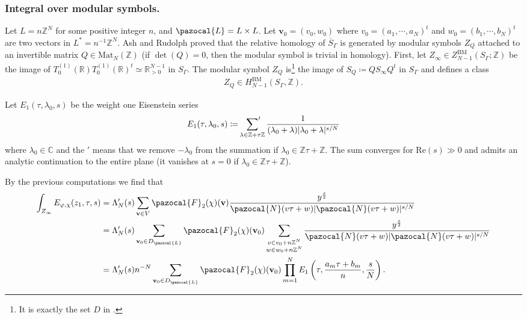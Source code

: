 \documentclass[a4paper,11pt]{amsart} %
\newcommand{\8}{\infty}
\newcommand{\Z}{\mathbb{Z}}
\newcommand{\vbf}{\mathbf{v}}
\newcommand{\four}{\pazocal{F}}
\newcommand{\BM}{\mathrm{BM}}
\newcommand{\R}{\mathbb{R}}
\newcommand{\C}{\mathbb{C}}
\newcommand{\N}{\pazocal{N}}
\newcommand{\Lcal}{\pazocal{L}}
\newcommand{\re}{\mathrm{Re}}
\newcommand{\Mat}{\mathrm{Mat}}
\theoremstyle{mytheoremstyle}
\theoremstyle{remark}
\numberwithin{equation}{section}
\begin{document}
\subsubsection{Integral over modular symbols.} Let $L=n\Z^{N}$ for some positive integer $n$, and $\Lcal=L \times L$. Let $\vbf_0=(v_0,w_0)$ where $v_0=(a_1, \cdots, a_N)^t$ and $w_0=(b_1, \cdots, b_N)^t$ are two vectors in $L^\ast = n^{-1}\Z^{N}$. Ash and Rudolph \cite{ashrud} proved that the relative homology of $\overline{S}_\Gamma$ is generated by modular symbols $Z_Q$ attached to an invertible matrix $Q \in \Mat_N(\Z)$ (if $\det(Q) =0$, then the modular symbol is trivial in homology). First, let $Z_\8 \in Z^{\BM}_{N-1}(S_\Gamma;\Z)$ be the image of $T_0^{(1)}(\R)T_0^{(1)}(\R)^t \simeq \R_{>0}^{N-1}$ in $S_\Gamma$. The modular symbol $Z_Q$ is\footnote{It is exactly the set $D$ in \cite[p.~245]{ashrud}.} the image of $S_Q \coloneqq QS_\8Q^t$ in $S_\Gamma$ and defines a class
\begin{align}
Z_Q \in H^{\BM}_{N-1}(S_\Gamma,\Z).
\end{align}

Let $E_1(\tau,\lambda_0,s)$ be the weight one Eisenstein series
\begin{align}
E_1(\tau,\lambda_0,s) \coloneqq \sideset{}{^{\prime}}\sum_{\lambda \in \Z+\tau\Z }\frac{1}{(\lambda_0+\lambda)\vert \lambda_0+\lambda\rvert^{s/N}}
\end{align}
where $\lambda_0 \in \C$ and the $'$ means that we remove $-\lambda_0$ from the summation if $\lambda_0 \in \Z \tau+\Z$. The sum converges for $\re(s) \gg 0$ and admits an analytic continuation to the entire plane (it vanishes at $s=0$ if $\lambda_0 \in \Z\tau+ \Z$).

By the previous computations we find that
\begin{align} \label{prodeisenstein}
\int_{Z_\8} E_{\varphi, \chi}(z_1,\tau,s)& = \Lambda'_N(s) \sum_{\vbf \in V} \four_2(\chi)(\vbf) \frac{y^{\frac{s}{2}}}{ \N(v\tau+w)\lvert \N(v\tau+w)\rvert^{s/N}} \nonumber \\
&= \Lambda'_N(s)\sum_{\vbf_0 \in D_\Lcal} \four_2(\chi)(\vbf_0) \sum_{\substack{v \in v_0+n\Z^N \\ w \in w_0+n\Z^N}} \frac{y^{\frac{s}{2}}}{ \N(v\tau+w)\lvert \N(v\tau+w)\rvert^{s/N}} \nonumber \\
& = \Lambda'_N(s)n^{-N} \sum_{\vbf_0 \in D_\Lcal} \four_2(\chi)(\vbf_0) \prod_{m=1}^N E_1\left (\tau,\frac{a_m\tau+b_m}{n},\frac{s}{N}\right ).
\end{align}
\end{document}
